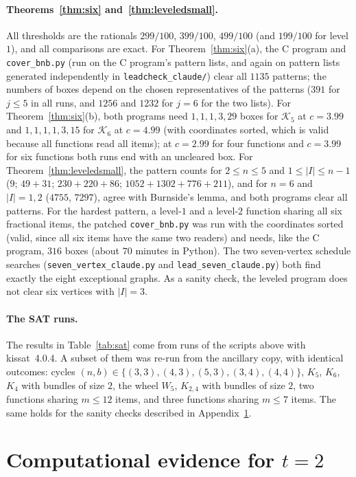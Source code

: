 \documentclass[11pt,letterpaper]{article}
\theoremstyle{definition}
\begin{document}
\paragraph{Theorems~\ref{thm:six} and~\ref{thm:leveledsmall}.}
All thresholds are the rationals $299/100$, $399/100$, $499/100$ (and $199/100$ for level $1$), and all
comparisons are exact. For Theorem~\ref{thm:six}(a), the C program and \texttt{cover\_bnb.py} (run on
the C program's pattern lists, and again on pattern lists generated independently in
\texttt{leadcheck\_claude/}) clear all $1135$ patterns; the numbers of boxes depend on the chosen
representatives of the patterns ($391$ for $j\le5$ in all runs, and $1256$ and $1232$ for $j=6$ for the two
lists). For Theorem~\ref{thm:six}(b), both programs need $1,1,1,3,29$ boxes for $\mathcal{K}_5$ at $c=3.99$ and
$1,1,1,1,3,15$ for $\mathcal{K}_6$ at $c=4.99$ (with coordinates sorted, which is valid because all
functions read all items); at $c=2.99$ for four functions and $c=3.99$ for six functions both runs
end with an uncleared box. For Theorem~\ref{thm:leveledsmall}, the pattern counts for $2\le n\le5$ and
$1\le|I|\le n-1$ ($9$; $49+31$; $230+220+86$; $1052+1302+776+211$), and for $n=6$ and $|I|=1,2$ ($4755$,
$7297$), agree with Burnside's lemma, and both programs clear all patterns. For the hardest pattern, a
level-$1$ and a level-$2$ function sharing all six fractional items, the patched \texttt{cover\_bnb.py} was
run with the coordinates sorted (valid, since all six items have the same two readers) and needs, like the
C program, $316$ boxes (about $70$ minutes in Python). The two seven-vertex schedule searches
(\texttt{seven\_vertex\_claude.py} and \texttt{lead\_seven\_claude.py}) both find exactly the eight
exceptional graphs. As a sanity check,
the leveled program does not clear six vertices with $|I|=3$.

\paragraph{The SAT runs.}
The results in Table~\ref{tab:sat} come from runs of the scripts above with kissat~4.0.4. A
subset of them was re-run from the ancillary copy, with identical outcomes: cycles $(n,b)\in\{(3,3),(4,3),(5,3),(3,4),(4,4)\}$,
$K_5$, $K_6$, $K_4$ with bundles of size $2$, the wheel $W_5$, $K_{2,4}$ with bundles of size $2$, two functions sharing $m\le12$
items, and three functions sharing $m\le7$ items. The same holds for the sanity checks described in
Appendix~\ref{sec:sat}.

\section{Computational evidence for \texorpdfstring{$t=2$}{t=2}}\label{sec:sat}
\end{document}
